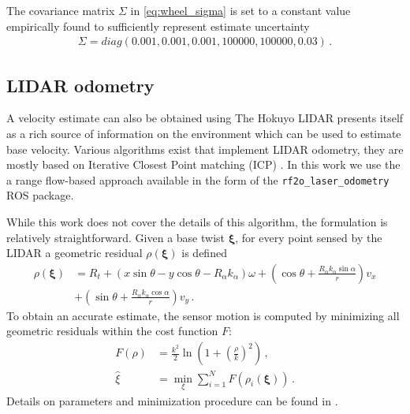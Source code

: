 \documentclass[times, utf8, diplomski, english]{fer}
\begin{document}
The covariance matrix $\Sigma$ in \eqref{eq:wheel_sigma} is set to a constant value empirically found to sufficiently represent estimate uncertainty
\begin{align}
\Sigma 
=
diag\left(0.001,0.001,0.001,100000,100000,0.03\right)\,.
\end{align}
\subsection{LIDAR odometry}\label{subsection:lidar_odometry}
A velocity estimate can also be obtained using 
The Hokuyo LIDAR presents itself as a rich source of information on the environment which can be used to estimate base velocity.
Various algorithms exist that implement LIDAR odometry, they are mostly based on Iterative Closest Point matching (ICP) \citep{besl1992method}.
In this work we use the a range flow-based approach available in the form of the \verb|rf2o_laser_odometry| ROS package.

While this work does not cover the details of this algorithm, the formulation is relatively straightforward.
Given a base twist $\mathbf{\xi}$, for every point sensed by the LIDAR a geometric residual $\rho\left(\mathbf{\xi}\right)$ is defined 
\begin{equation}
\begin{split}
\rho\left(\mathbf{\xi}\right) &= R_t + \left(x\sin\theta - y\cos\theta - R_\alpha k_\alpha\right)\omega + \left(\cos\theta + \frac{R_\alpha k_\alpha \sin\alpha}{r}\right)v_x \\
 &+ \left(\sin\theta + \frac{R_\alpha k_\alpha \cos\alpha}{r}\right)v_y\, .
 \end{split}
\end{equation}
To obtain an accurate estimate, the sensor motion is computed by minimizing all geometric residuals within the cost function $F$:
\begin{align}
F\left(\rho\right) &= \frac{k^2}{2}\ln{\left(1 + \left(\frac{\rho}{k}\right)^2\right)}\, , \\
\hat{\xi} &= \min\limits_{\xi} \sum\limits_{i=1}^{N} F \left(\rho_i \left( \mathbf{\xi} \right) \right)\, .
\end{align}
Details on parameters and minimization procedure can be found in \citep{jaimez2016planar}.
\end{document}
